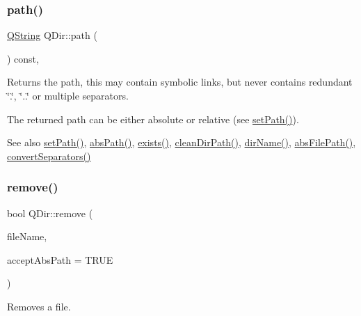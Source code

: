 \subsubsection{\texorpdfstring{path()}{path()}}
{\footnotesize\ttfamily \mbox{\hyperlink{class_q_string}{Q\+String}} Q\+Dir\+::path (\begin{DoxyParamCaption}{ }\end{DoxyParamCaption}) const\hspace{0.3cm}{\ttfamily [inline]}, {\ttfamily [virtual]}}

Returns the path, this may contain symbolic links, but never contains redundant \char`\"{}.\char`\"{}, \char`\"{}..\char`\"{} or multiple separators.

The returned path can be either absolute or relative (see \mbox{\hyperlink{class_q_dir_ac947989c99aecbfebd509088b8834715}{set\+Path()}}).

\begin{DoxySeeAlso}{See also}
\mbox{\hyperlink{class_q_dir_ac947989c99aecbfebd509088b8834715}{set\+Path()}}, \mbox{\hyperlink{class_q_dir_a1464e556606a3223b8db1b3629c41cb7}{abs\+Path()}}, \mbox{\hyperlink{class_q_dir_a97e8132d482e374745230de942def208}{exists()}}, \mbox{\hyperlink{class_q_dir_ad38037708dc754f5bdd877c145dbbb19}{clean\+Dir\+Path()}}, \mbox{\hyperlink{class_q_dir_a2c904d64a7194a57ee583d111cbbdeff}{dir\+Name()}}, \mbox{\hyperlink{class_q_dir_aca84b0a728bc2b88c3ab55cbed6e18c4}{abs\+File\+Path()}}, \mbox{\hyperlink{class_q_dir_a2cb829f147b7225abab1e5915ae62264}{convert\+Separators()}} 
\end{DoxySeeAlso}
\mbox{\label{class_q_dir_aca44a22e3f1355bc74fdd96e0af052c9}} 
\subsubsection{\texorpdfstring{remove()}{remove()}}
{\footnotesize\ttfamily bool Q\+Dir\+::remove (\begin{DoxyParamCaption}\item[{const \mbox{\hyperlink{class_q_string}{Q\+String}} \&}]{file\+Name,  }\item[{bool}]{accept\+Abs\+Path = {\ttfamily TRUE} }\end{DoxyParamCaption})\hspace{0.3cm}{\ttfamily [virtual]}}

Removes a file.

